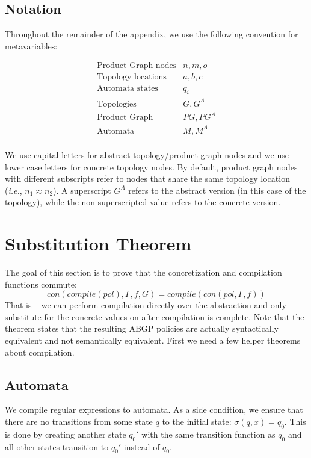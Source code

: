 \documentclass[twocolumn, openany]{sig-alternate-10pt}
\newcommand{\IE}{\emph{i.e.}}
\begin{document}
\subsection{Notation}

Throughout the remainder of the appendix, we use the following convention for metavariables:

\[ \begin{array}{ll}
  \text{Product Graph nodes} & n,m,o \\
  \text{Topology locations} & a,b,c \\
  \text{Automata states} & q_i \\
  \text{Topologies} & G, G^A \\
  \text{Product Graph} & PG, PG^A \\
  \text{Automata} & M, M^A \\
\end{array} \]

We use capital letters for abstract topology/product graph nodes and we use lower case letters for concrete topology nodes. By default, product graph nodes with different subscripts refer to nodes that share the same topology location (\IE, $n_1 \approx n_2$). A superscript $G^A$ refers to the abstract version (in this case of the topology), while the non-superscripted value refers to the concrete version.


\section{Substitution Theorem}

The goal of this section is to prove that the concretization and compilation functions commute: 
$$con(compile(pol),\Gamma,f,G) = compile(con(pol,\Gamma,f))$$ 
That is -- we can perform compilation directly over the abstraction and only substitute for the concrete values on after compilation is complete. Note that the theorem states that the resulting ABGP policies are actually syntactically equivalent and not semantically equivalent. First we need a few helper theorems about compilation.

\subsection{Automata}

\newcommand{\Lang}{\ensuremath{\mathcal{L}}}

We compile regular expressions to automata. As a side condition, we ensure that there are no transitions from some state $q$ to the initial state: $\sigma(q,x) = q_0$. This is done by creating another state $q_0'$ with the same transition function as $q_0$ and all other states transition to $q_0'$ instead of $q_0$.
\end{document}
